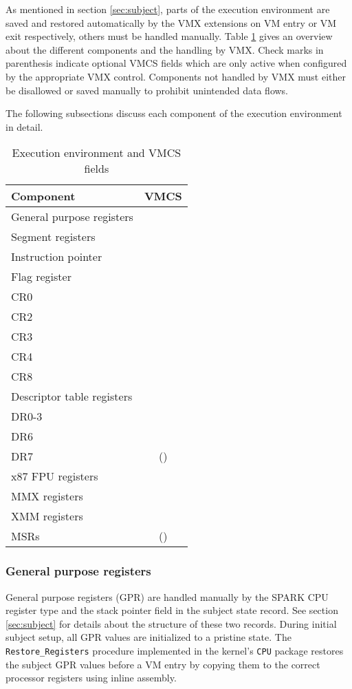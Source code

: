 As mentioned in section \ref{sec:subject}, parts of the execution environment
are saved and restored automatically by the VMX extensions on VM entry or VM
exit respectively, others must be handled manually. Table
\ref{tab:exec-env-storage} gives an overview about the different components and
the handling by VMX. Check marks in parenthesis indicate optional VMCS fields
which are only active when configured by the appropriate VMX control. Components
not handled by VMX must either be disallowed or saved manually to prohibit
unintended data flows.

The following subsections discuss each component of the execution environment in
detail.

\begin{table}[h]
	\centering
	\begin{tabular}{l|c}
		\textbf{Component} & \textbf{VMCS} \\
		\hline
		General purpose registers  & \\
		Segment registers          & \checkmark \\
		Instruction pointer        & \checkmark \\
		Flag register              & \checkmark \\
		CR0                        & \checkmark \\
		CR2                        & \\
		CR3                        & \checkmark \\
		CR4                        & \checkmark \\
		CR8                        & \\
		Descriptor table registers & \checkmark \\
		DR0-3                      & \\
		DR6                        & \\
		DR7                        & (\checkmark) \\
		x87 FPU registers          & \\
		MMX registers              & \\
		XMM registers              & \\
		MSRs                       & (\checkmark) \\
		\hline
	\end{tabular}
	\caption{Execution environment and VMCS fields}
	\label{tab:exec-env-storage}
\end{table}

\subsubsection{General purpose registers}
General purpose registers (GPR) are handled manually by the SPARK CPU
register type and the stack pointer field in the subject state record. See
section \ref{sec:subject} for details about the structure of these two records.
During initial subject setup, all GPR values are initialized to a pristine
state. The \texttt{Restore\_Registers} procedure implemented in the kernel's
\texttt{CPU} package restores the subject GPR values before a VM entry by
copying them to the correct processor registers using inline assembly.

